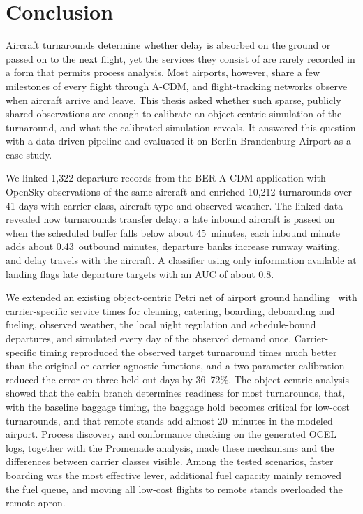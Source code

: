 \chapter{Conclusion}
\label{ch:conclusion}

Aircraft turnarounds determine whether delay is absorbed on the ground or passed on to the next flight, yet the services they consist of are rarely recorded in a form that permits process analysis. Most airports, however, share a few milestones of every flight through A-CDM, and flight-tracking networks observe when aircraft arrive and leave. This thesis asked whether such sparse, publicly shared observations are enough to calibrate an object-centric simulation of the turnaround, and what the calibrated simulation reveals. It answered this question with a data-driven pipeline and evaluated it on Berlin Brandenburg Airport as a case study.

We linked 1,322 departure records from the BER A-CDM application with OpenSky observations of the same aircraft and enriched 10,212 turnarounds over 41 days with carrier class, aircraft type and observed weather. The linked data revealed how turnarounds transfer delay: a late inbound aircraft is passed on when the scheduled buffer falls below about 45~minutes, each inbound minute adds about 0.43~outbound minutes, departure banks increase runway waiting, and delay travels with the aircraft. A classifier using only information available at landing flags late departure targets with an AUC of about 0.8.

We extended an existing object-centric Petri net of airport ground handling~\cite{ocpn_studio} with carrier-specific service times for cleaning, catering, boarding, deboarding and fueling, observed weather, the local night regulation and schedule-bound departures, and simulated every day of the observed demand once. Carrier-specific timing reproduced the observed target turnaround times much better than the original or carrier-agnostic functions, and a two-parameter calibration reduced the error on three held-out days by 36--72\%. The object-centric analysis showed that the cabin branch determines readiness for most turnarounds, that, with the baseline baggage timing, the baggage hold becomes critical for low-cost turnarounds, and that remote stands add almost 20~minutes in the modeled airport. Process discovery and conformance checking on the generated OCEL logs, together with the Promenade analysis, made these mechanisms and the differences between carrier classes visible. Among the tested scenarios, faster boarding was the most effective lever, additional fuel capacity mainly removed the fuel queue, and moving all low-cost flights to remote stands overloaded the remote apron.

